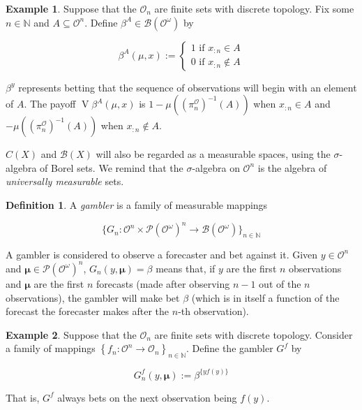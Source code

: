 \documentclass[aop,preprint]{imsart}
\numberwithin{equation}{section}
\theoremstyle{definition}
\newtheorem{definition}{Definition}[section]
\newtheorem{example}{Example}[section]
\theoremstyle{plain}
\newcommand{\Nats}{\mathbb{N}}
\newcommand{\Sq}[2]{\{#1\}_{#2 \in \Nats}}
\newcommand{\Sqn}[1]{\Sq{#1}{n}}
\newcommand{\PM}{\mathcal{P}}
\newcommand{\Ob}{\mathcal{O}}
\newcommand{\OO}{\Ob^\omega}
\newcommand{\PO}{\pi^\Ob}
\newcommand{\PMO}{\PM(\OO)}
\newcommand{\Gm}{\mathcal{B}}
\newcommand{\GMO}{\Gm(\OO)}
\DeclareMathOperator{\V}{V}
\newcommand{\BM}{\bm{\mu}}
\begin{document}
\begin{samepage}
\begin{example}

Suppose that the $\Ob_n$ are finite sets with discrete topology. Fix some $n\in\Nats$ and $A \subseteq \Ob^n$. Define $\beta^A \in \GMO$ by

\begin{equation}
\beta^{A}(\mu,x):=\begin{cases} 1 \text{ if } x_{:n} \in A \\ 0 \text{ if } x_{:n} \not\in A \end{cases}
\end{equation}


$\beta^y$ represents betting that the sequence of observations will begin with an element of $A$. The payoff $\V{\beta^A}(\mu,x)$ is $1 - \mu\left(\left(\PO_n\right)^{-1}(A)\right)$ when $x_{:n} \in A$ and $-\mu\left(\left(\PO_n\right)^{-1}(A)\right)$ when $x_{:n} \not\in A$.

\end{example}
\end{samepage}

$C\left(X\right)$ and $\Gm\left(X\right)$ will also be regarded as a measurable spaces, using the $\sigma$-algebra of Borel sets. We remind that the $\sigma$-algebra on $\Ob^n$ is the algebra of \emph{universally measurable} sets.

\begin{definition}

A \emph{gambler} is a family of measurable mappings

\[\Sqn{G_n : \Ob^n \times \PMO^n \rightarrow \Gm\left(\OO\right)}\]

\end{definition}

A gambler is considered to observe a forecaster and bet against it. Given $y \in \Ob^n$ and $\BM \in \PMO^n$, $G_n\left(y,\BM\right)=\beta$ means that, if $y$ are the first $n$ observations and $\BM$ are the first $n$ forecasts (made after observing $n-1$ out of the $n$ observations), the gambler will make bet $\beta$ (which is in itself a function of the forecast the forecaster makes after the $n$-th observation).

\begin{samepage}
\begin{example}

Suppose that the $\Ob_n$ are finite sets with discrete topology. Consider a family of mappings $\left\{f_n: \Ob^n \rightarrow \Ob_n\right\}_{n\in\Nats}$. Define the gambler $G^f$ by

\begin{equation}
G^f_n(y,\BM):=\beta^{\{yf(y)\}}
\end{equation}

That is, $G^f$ always bets on the next observation being $f(y)$.

\end{example}
\end{samepage}
\end{document}
